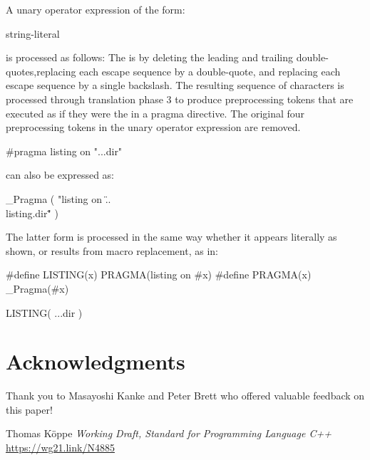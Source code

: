 \documentclass{wg21}
\begin{document}
\pnum
A unary operator expression of the form:

\begin{ncbnf}
     \terminal{(} string-literal \terminal{)}
\end{ncbnf}

is processed as follows: The  
is  by
 deleting the leading and trailing
double-quotes,replacing each escape sequence  by a double-quote, and
replacing each escape sequence \tcode{\textbackslash\textbackslash} by a single
backslash. The resulting sequence of characters is processed through translation phase 3
to produce preprocessing tokens that are executed as if they were the
 in a pragma directive. The original four preprocessing
tokens in the unary operator expression are removed.

\pnum
\begin{example}
\begin{codeblock}
    #pragma listing on "..\listing.dir"
\end{codeblock}
can also be expressed as:
\begin{codeblock}
    _Pragma ( "listing on \"..\\listing.dir\"" )
\end{codeblock}
The latter form is processed in the same way whether it appears literally
as shown, or results from macro replacement, as in:
\begin{codeblock}
    #define LISTING(x) PRAGMA(listing on #x)
    #define PRAGMA(x) _Pragma(#x)

    LISTING( ..\listing.dir )
\end{codeblock}
\end{example}


\section{Acknowledgments}

Thank you to Masayoshi Kanke and Peter Brett who offered valuable feedback on this paper!






\renewcommand{\section}[2]{}%
\begin{thebibliography}{9}

Thomas Köppe
\emph{Working Draft, Standard for Programming Language C++}\newline
\url{https://wg21.link/N4885}

\end{thebibliography}
\end{document}
